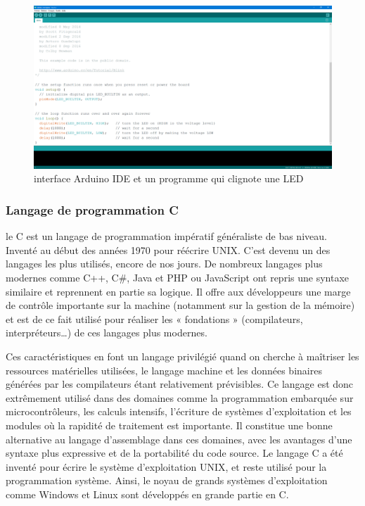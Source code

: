 \begin{figure}[h!]
    \centering
    \includegraphics[scale=0.3]{images/arduino_ide.PNG}
    \caption{interface Arduino IDE et un programme qui clignote une LED}
    \label{fig61}
\end{figure}

\subsubsection{Langage de programmation C}
le C est un langage de programmation impératif généraliste de bas niveau. Inventé 
au début des années 1970 pour réécrire UNIX. C’est devenu un des langages les 
plus utilisés, encore de nos jours. De nombreux langages plus modernes comme 
C++, C#, Java et PHP ou JavaScript ont repris une syntaxe similaire et 
reprennent en partie sa logique. Il offre aux développeurs une marge de contrôle 
importante sur la machine (notamment sur la gestion de la mémoire) et est de ce 
fait utilisé pour réaliser les « fondations » (compilateurs, interpréteurs…) de 
ces langages plus modernes.

Ces caractéristiques en font un langage privilégié quand on cherche à maîtriser 
les ressources matérielles utilisées, le langage machine et les données binaires 
générées par les compilateurs étant relativement prévisibles. Ce langage est 
donc extrêmement utilisé dans des domaines comme la programmation embarquée sur 
microcontrôleurs, les calculs intensifs, l’écriture de systèmes d’exploitation 
et les modules où la rapidité de traitement est importante. Il constitue une 
bonne alternative au langage d’assemblage dans ces domaines, avec les avantages 
d’une syntaxe plus expressive et de la portabilité du code source. Le langage C 
a été inventé pour écrire le système d’exploitation UNIX, et reste utilisé pour 
la programmation système. Ainsi, le noyau de grands systèmes d’exploitation comme 
Windows et Linux sont développés en grande partie en C.

